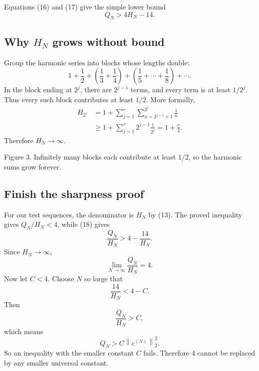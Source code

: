 \documentclass[11pt]{article}
\newcommand{\norm}[1]{\left\lVert #1\right\rVert}
\begin{document}
Equations (16) and (17) give the simple lower bound
\[
  \boxed{Q_N>4H_N-14.}
  \tag{18}
\]

\subsection{Why \(H_N\) grows without bound}

Group the harmonic series into blocks whose lengths double:
\[
  1+\frac12
  +\left(\frac13+\frac14\right)
  +\left(\frac15+\cdots+\frac18\right)+\cdots.
\]
In the block ending at \(2^j\), there are \(2^{j-1}\) terms, and every term is at least \(1/2^j\). Thus every such block contributes at least \(1/2\). More formally,
\[
\begin{aligned}
 H_{2^r}
 &=1+\sum_{j=1}^{r}
   \sum_{n=2^{j-1}+1}^{2^j}\frac1n\\
 &\geq1+\sum_{j=1}^{r}2^{j-1}\frac1{2^j}
 =1+\frac r2.
\end{aligned}
\tag{19}
\]
Therefore \(H_N\to\infty\).

\begin{center}

\small Figure 3. Infinitely many blocks each contribute at least \(1/2\), so the harmonic sums grow forever.
\end{center}

\subsection{Finish the sharpness proof}

For our test sequences, the denominator is \(H_N\) by (13). The proved inequality gives \(Q_N/H_N<4\), while (18) gives
\[
  \frac{Q_N}{H_N}>4-\frac{14}{H_N}.
\]
Since \(H_N\to\infty\),
\[
  \boxed{\displaystyle
  \lim_{N\to\infty}\frac{Q_N}{H_N}=4.}
  \tag{20}
\]
Now let \(C<4\). Choose \(N\) so large that
\[
  \frac{14}{H_N}<4-C.
\]
Then
\[
  \frac{Q_N}{H_N}>C,
\]
which means
\[
  Q_N>C\norm{c^{(N)}}_2^2.
\]
So an inequality with the smaller constant \(C\) fails. Therefore \(4\) cannot be replaced by any smaller universal constant.
\end{document}
